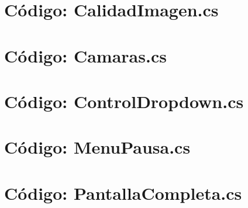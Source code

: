\documentclass[final,letterpaper,oneside,authoryear,11pt,singlespace,spanish]{ezthesis}
\begin{document}
\chapter{Código: CalidadImagen.cs} 
\chapter{Código: Camaras.cs} 
\chapter{Código: ControlDropdown.cs} 
\chapter{Código: MenuPausa.cs} 
\chapter{Código: PantallaCompleta.cs} 
\end{document}
